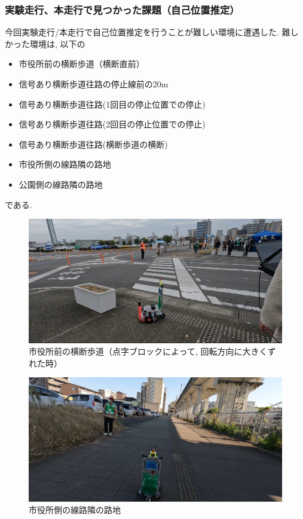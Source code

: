 \documentclass[twocolumn,9pt]{jsproceedings}
\begin{document}
\subsubsection{実験走行、本走行で見つかった課題（自己位置推定）}

今回実験走行/本走行で自己位置推定を行うことが難しい環境に遭遇した. 
難しかった環境は, 以下の
\begin{itemize}
  \item 市役所前の横断歩道（横断直前）
  \item 信号あり横断歩道往路の停止線前の20m
  \item 信号あり横断歩道往路(1回目の停止位置での停止)
  \item 信号あり横断歩道往路(2回目の停止位置での停止)
  \item 信号あり横断歩道往路(横断歩道の横断)
  \item 市役所側の線路隣の路地
  \item 公園側の線路隣の路地
\end{itemize}
である. 

\begin{figure}[h]
  \begin{center}
    \includegraphics[width=1.0\linewidth]{figs/crosswalk_city_hall.pdf}
    \caption{市役所前の横断歩道（点字ブロックによって, 回転方向に大きくずれた時）}
    \label{fig:crosswalk_city_hall}
  \end{center}
\end{figure}

\begin{figure}[h]
  \begin{center}
    \includegraphics[width=1.0\linewidth]{figs/city_hall_side_alley.pdf}
    \caption{市役所側の線路隣の路地}
    \label{fig:city_hall_side_alley}
  \end{center}
\end{figure}
\end{document}
